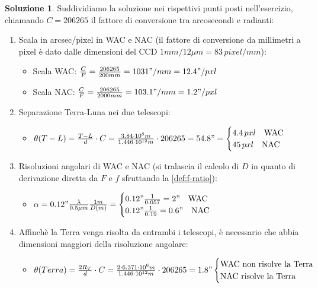 \documentclass[a4paper,twoside,openany,notitlepage]{book}
\newcommand{\e}[1]{\cdot 10^{#1}}
\theoremstyle{definition}
\newtheorem{sol}{Soluzione}
\theoremstyle{plain}
\begin{document}
\begin{sol}
	Suddividiamo la soluzione nei rispettivi punti posti nell'esercizio, chiamando $C=206265$ il fattore di conversione tra arcosecondi e radianti:
	\begin{enumerate}
		\item Scala in arcsec/pixel in WAC e NAC (il fattore di conversione da millimetri a pixel è dato dalle dimensioni del CCD $1mm / 12\mu m = 83 \,pixel / mm$):
		\begin{itemize}
			\item Scala WAC: $\frac{C}{F}=\frac{206265}{200mm}=1031"/mm=12.4"/pxl$
			\item Scala NAC: $\frac{C}{F}=\frac{206265}{2000mm}=103.1"/mm=1.2"/pxl$
		\end{itemize}
		\item Separazione Terra-Luna nei due telescopi:
		\begin{itemize}
			\item $\theta(T-L)=\frac{T-L}{d}\cdot C=\frac{3.84\e{8}m}{1.446\e{12}m}\cdot 206265=54.8"=
			\begin{cases}
				4.4 \, pxl \quad \text{WAC} \\
				45 \, pxl \quad \text{NAC}
			\end{cases}
			$
		\end{itemize}
		\item Risoluzioni angolari di WAC e NAC (si tralascia il calcolo di $D$ in quanto di derivazione diretta da $F$ e $f$ sfruttando la \ref{def:f-ratio}):
		\begin{itemize}
			\item $\alpha=0.12"\frac{\lambda}{0.5\mu m}\frac{1m}{D(m)}=
			\begin{cases}
				0.12"\frac{1}{0.057}=2" \quad \text{WAC} \\
				0.12"\frac{1}{0.19}=0.6"\quad \text{NAC}
			\end{cases}
			$
		\end{itemize}
		\item Affinchè la Terra venga risolta da entrambi i telescopi, è necessario che abbia dimensioni maggiori della risoluzione angolare:
		\begin{itemize}
			\item $\theta(Terra)=\frac{2R_T}{d}\cdot C=\frac{2\cdot 6.371\e{6}m}{1.446\e{12}m}\cdot 206265=1.8"
			\begin{cases}
				\text{WAC non risolve la Terra} \\
				\text{NAC risolve la Terra}
			\end{cases}
			$
		\end{itemize}
	\end{enumerate}
\end{sol}
\end{document}
